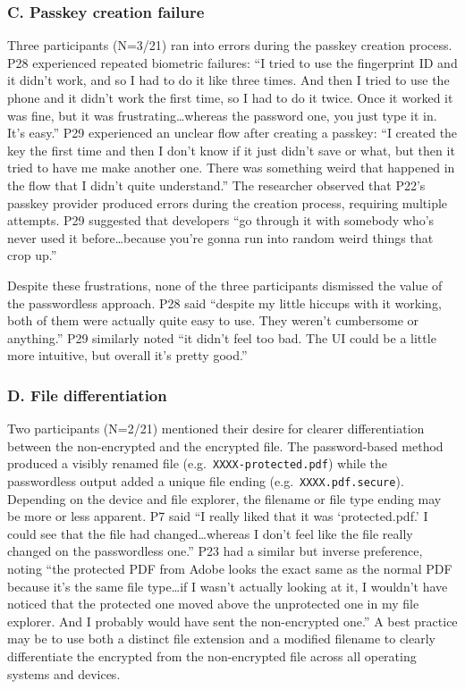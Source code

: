 \subsubsection*{C. Passkey creation failure}

Three participants (N=3/21) ran into errors during the passkey creation process. P28 experienced repeated biometric failures: ``I tried to use the fingerprint ID and it didn't work, and so I had to do it like three times. And then I tried to use the phone and it didn't work the first time, so I had to do it twice. Once it worked it was fine, but it was frustrating\ldots whereas the password one, you just type it in. It's easy.'' P29 experienced an unclear flow after creating a passkey: ``I created the key the first time and then I don't know if it just didn't save or what, but then it tried to have me make another one. There was something weird that happened in the flow that I didn't quite understand.'' The researcher observed that P22's passkey provider produced errors during the creation process, requiring multiple attempts. P29 suggested that developers ``go through it with somebody who's never used it before\ldots because you're gonna run into random weird things that crop up.''

Despite these frustrations, none of the three participants dismissed the value of the passwordless approach. P28 said ``despite my little hiccups with it working, both of them were actually quite easy to use. They weren't cumbersome or anything.'' P29 similarly noted ``it didn't feel too bad. The UI could be a little more intuitive, but overall it's pretty good.''

\subsubsection*{D. File differentiation}

Two participants (N=2/21) mentioned their desire for clearer differentiation between the non-encrypted and the encrypted file. The password-based method produced a visibly renamed file (e.g.\ \texttt{XXXX-protected.pdf}) while the passwordless output added a unique file ending (e.g.\ \texttt{XXXX.pdf.\allowbreak secure}). Depending on the device and file explorer, the filename or file type ending may be more or less apparent. P7 said ``I really liked that it was `protected.pdf.' I could see that the file had changed\ldots whereas I don't feel like the file really changed on the passwordless one.'' P23 had a similar but inverse preference, noting ``the protected PDF from Adobe looks the exact same as the normal PDF because it's the same file type\ldots if I wasn't actually looking at it, I wouldn't have noticed that the protected one moved above the unprotected one in my file explorer. And I probably would have sent the non-encrypted one.'' A best practice may be to use both a distinct file extension and a modified filename to clearly differentiate the encrypted from the non-encrypted file across all operating systems and devices.

